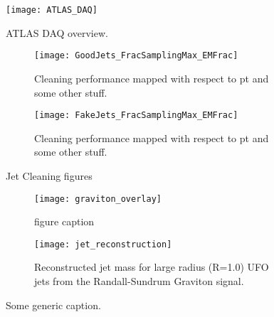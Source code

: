 \documentclass[12pt]{article}
\begin{document}
\newpage
\begin{figure}[t]
    \centering
    \texttt{[image: ATLAS\_DAQ]}
    \caption{ATLAS DAQ overview. \cite{Aad_2024}}
    \label{fig:daq_schematic}
\end{figure}

\newpage

\begin{figure}[t]
    \centering
    \begin{subfigure}[t]{.45\textwidth}
        \centering
        \texttt{[image: GoodJets\_FracSamplingMax\_EMFrac]}
        \caption{Cleaning performance mapped with respect to pt and some other stuff.}
        \label{subfig:tight_th2}
    \end{subfigure}
    \hfill
    \begin{subfigure}[t]{.45\textwidth}
        \centering
        \texttt{[image: FakeJets\_FracSamplingMax\_EMFrac]}
        \caption{Cleaning performance mapped with respect to pt and some other stuff.}
        \label{subfig:tenacious_th2}
    \end{subfigure} %
\caption{Jet Cleaning figures}
\label{fig:cleaning_performance_subfigure}
\end{figure}

\begin{figure}[t]
    \centering
    \begin{subfigure}[t]{.48\textwidth}
        \centering
        \texttt{[image: graviton\_overlay]}
        \caption{figure caption}
        \label{subfig:graviton_overlay}
    \end{subfigure}
    \hfill
    \begin{subfigure}[t]{.48\textwidth}
        \centering
        \texttt{[image: jet\_reconstruction]}
        \caption{Reconstructed jet mass for large radius (R=1.0) UFO jets from
        the Randall-Sundrum Graviton signal.}
        \label{subfig:ufo_rsg_reconstruction}
    \end{subfigure} %
\caption{Some generic caption.}
\label{fig:some_generic_figure}
\end{figure}

\newpage
\newpage
{}
\end{document}

